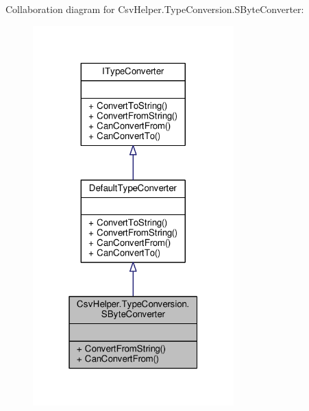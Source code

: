 Collaboration diagram for Csv\-Helper.\-Type\-Conversion.\-S\-Byte\-Converter\-:
\nopagebreak
\begin{figure}[H]
\begin{center}
\leavevmode
\includegraphics[width=220pt]{a00535}
\end{center}
\end{figure}
